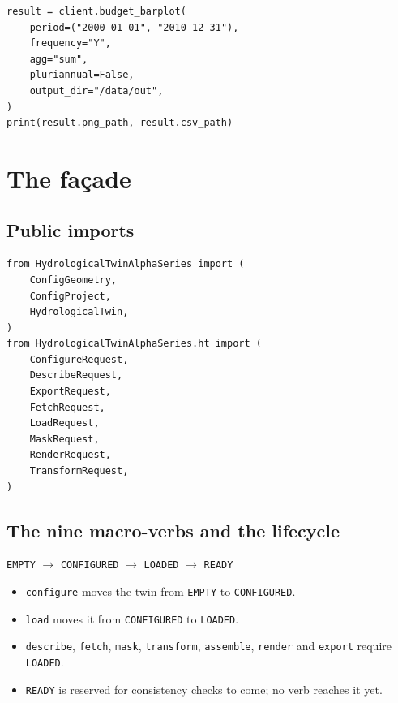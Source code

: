 \documentclass[11pt]{article}
\begin{document}
\begin{verbatim}
result = client.budget_barplot(
    period=("2000-01-01", "2010-12-31"),
    frequency="Y",
    agg="sum",
    pluriannual=False,
    output_dir="/data/out",
)
print(result.png_path, result.csv_path)
\end{verbatim}


\section{The façade}\label{sec:facade}

\subsection{Public imports}

\begin{verbatim}
from HydrologicalTwinAlphaSeries import (
    ConfigGeometry,
    ConfigProject,
    HydrologicalTwin,
)
from HydrologicalTwinAlphaSeries.ht import (
    ConfigureRequest,
    DescribeRequest,
    ExportRequest,
    FetchRequest,
    LoadRequest,
    MaskRequest,
    RenderRequest,
    TransformRequest,
)
\end{verbatim}

\subsection{The nine macro-verbs and the lifecycle}

\begin{center}
\texttt{EMPTY} $\rightarrow$ \texttt{CONFIGURED} $\rightarrow$ \texttt{LOADED} $\rightarrow$ \texttt{READY}
\end{center}

\begin{itemize}
    \item \texttt{configure} moves the twin from \texttt{EMPTY} to \texttt{CONFIGURED}.
    \item \texttt{load} moves it from \texttt{CONFIGURED} to \texttt{LOADED}.
    \item \texttt{describe}, \texttt{fetch}, \texttt{mask}, \texttt{transform},
    \texttt{assemble}, \texttt{render} and \texttt{export} require \texttt{LOADED}.
    \item \texttt{READY} is reserved for consistency checks to come; no verb reaches it yet.
\end{itemize}
\end{document}
